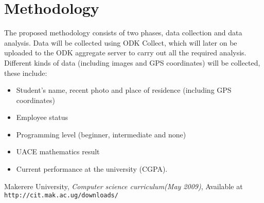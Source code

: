 \documentclass[options]{article}
\begin{document}
\section{\textbf{Methodology}}
The proposed methodology consists of two phases, data collection and data analysis.\bigbreak
Data will be collected using ODK Collect, which will later on be uploaded to the ODK aggregate server to carry out all the required analysis. Different kinds of data (including images and GPS coordinates) will be collected, these include: 

\begin{itemize}
  \item Student’s name, recent photo and place of residence (including GPS coordinates)
  \item Employee status
  \item Programming level (beginner, intermediate and none)
  \item UACE mathematics result
  \item Current performance at the university (CGPA). 
\end{itemize}



\begin{thebibliography}{10}  Makerere University, \emph{Computer science curriculum(May 2009)}, Available at \texttt{http://cit.mak.ac.ug/downloads/} \end{thebibliography}
\end{document}
